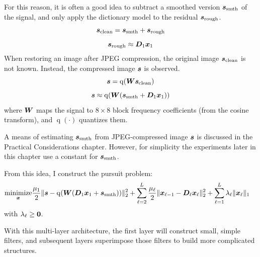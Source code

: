 For this reason, it is often a good idea to subtract a smoothed version $\bm{s}_{\text{smth}}$ of the signal, and only apply the dictionary model to the residual $\bm{s}_{\text{rough}}$.
%
\begin{equation}
\bm{s}_{\text{clean}} = \bm{s}_{\text{smth}} + \bm{s}_{\text{rough}}
\end{equation}
%
\begin{equation}
\bm{s}_{\text{rough}} \approx \bm{D}_1\bm{x}_1
\end{equation}
%
When restoring an image after JPEG compression, the original image $\bm{s}_{\text{clean}}$ is not known. Instead, the compressed image $\bm{s}$ is observed.
%
\begin{equation}
\bm{s} = \operatorname{q}(\bm{W}\bm{s}_{\text{clean}})
\end{equation}
%
\begin{equation}
\bm{s} \approx \operatorname{q}(\bm{W}(\bm{s}_{\text{smth}} + \bm{D}_1\bm{x}_1))
\end{equation}
%
where $\bm{W}$ maps the signal to $8 \times 8$ block frequency coefficients (from the cosine transform), and $\operatorname{q}(\cdot)$ quantizes them.

A means of estimating $\bm{s}_{\text{smth}}$ from JPEG-compressed image $\bm{s}$ is discussed in the Practical Considerations chapter. However, for simplicity the experiments later in this chapter use a constant for $\bm{s}_{\text{smth}}$.

From this idea, I construct the pursuit problem:
\begin{equation}
\begin{aligned}\label{equation:JPEG Sparse Coding Objective}
\operatorname*{\text{minimize}}_{\bm{x}} & \frac{\mu_1}{2}\|\bm{s} - \operatorname{q}(\bm{W}(\bm{D}_1\bm{x}_1 + \bm{s}_{\text{smth}}))\|_2^2 + \sum_{\ell = 2}^L \frac{\mu_{\ell}}{2}\|\bm{x}_{\ell - 1} - \bm{D}_{\ell}\bm{x}_{\ell}\|_2^2 + \sum_{\ell = 1}^L \lambda_{\ell}\|\bm{x}_{\ell}\|_1 
\end{aligned}
\end{equation}
%
with $\lambda_{\ell} \geq \bm{0}$.

With this multi-layer architecture, the first layer will construct small, simple filters, and subsequent layers superimpose those filters to build more complicated structures.

